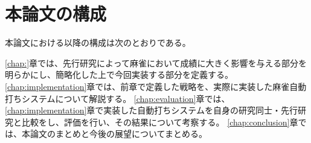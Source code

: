 \section{本論文の構成}
本論文における以降の構成は次のとおりである。

\ref{chap:}章では、先行研究によって麻雀において成績に大きく影響を与える部分を明らかにし、簡略化した上で今回実装する部分を定義する。
\ref{chap:implementation}章では、前章で定義した戦略を、実際に実装した麻雀自動打ちシステムについて解説する。
\ref{chap:evaluation}章では、\ref{chap:implementation}章で実装した自動打ちシステムを自身の研究同士・先行研究と比較をし、評価を行い、その結果について考察する。
\ref{chap:conclusion}章では、本論文のまとめと今後の展望についてまとめる。